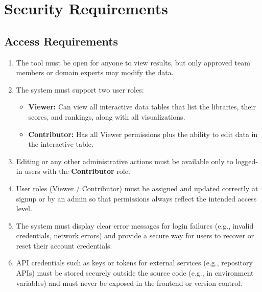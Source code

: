 \documentclass[12pt]{article}
\begin{document}
\section{Security Requirements}
\subsection{Access Requirements}


\begin{enumerate}[label=SR-AC\arabic*]

  \item The tool must be open for anyone to view results, but only approved team members or domain experts may modify the data.

  \item The system must support two user roles:
    \begin{itemize}
        \item \textbf{Viewer:} Can view all interactive data tables that list the libraries, their scores, and rankings, along with all visualizations.
        \item \textbf{Contributor:} Has all Viewer permissions plus the ability to edit data in the interactive table.
    \end{itemize}

  \item Editing or any other administrative actions must be available only to logged-in users with the \textbf{Contributor} role.

  \item User roles (Viewer / Contributor) must be assigned and updated correctly at signup or by an admin so that permissions always reflect the intended access level.

  \item The system must display clear error messages for login failures (e.g., invalid credentials, network errors) and provide a secure way for users to recover or reset their account credentials.

  \item API credentials such as keys or tokens for external services (e.g., repository APIs) must be stored securely outside the source code (e.g., in environment variables) and must never be exposed in the frontend or version control.

\end{enumerate}
\end{document}
